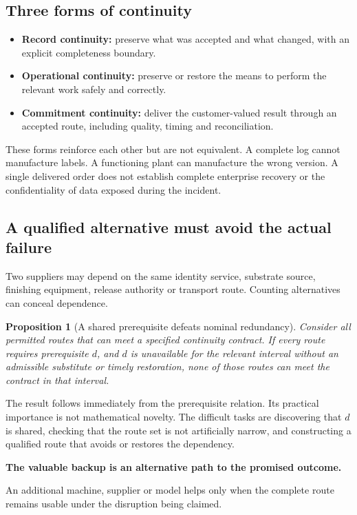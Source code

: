 \documentclass[11pt,a4paper]{article}
\newtheorem{proposition}{Proposition}
\begin{document}
\subsection{Three forms of continuity}
\begin{itemize}
\item \textbf{Record continuity:} preserve what was accepted and what changed, with an explicit completeness boundary.
\item \textbf{Operational continuity:} preserve or restore the means to perform the relevant work safely and correctly.
\item \textbf{Commitment continuity:} deliver the customer-valued result through an accepted route, including quality, timing and reconciliation.
\end{itemize}
These forms reinforce each other but are not equivalent. A complete log cannot manufacture labels. A functioning plant can manufacture the wrong version. A single delivered order does not establish complete enterprise recovery or the confidentiality of data exposed during the incident.

\subsection{A qualified alternative must avoid the actual failure}
Two suppliers may depend on the same identity service, substrate source, finishing equipment, release authority or transport route. Counting alternatives can conceal dependence.

\begin{proposition}[A shared prerequisite defeats nominal redundancy]
Consider all permitted routes that can meet a specified continuity contract. If every route requires prerequisite $d$, and $d$ is unavailable for the relevant interval without an admissible substitute or timely restoration, none of those routes can meet the contract in that interval.
\end{proposition}
The result follows immediately from the prerequisite relation. Its practical importance is not mathematical novelty. The difficult tasks are discovering that $d$ is shared, checking that the route set is not artificially narrow, and constructing a qualified route that avoids or restores the dependency.

\begin{insight}
\textbf{The valuable backup is an alternative path to the promised outcome.}\par
An additional machine, supplier or model helps only when the complete route remains usable under the disruption being claimed.
\end{insight}
\end{document}

